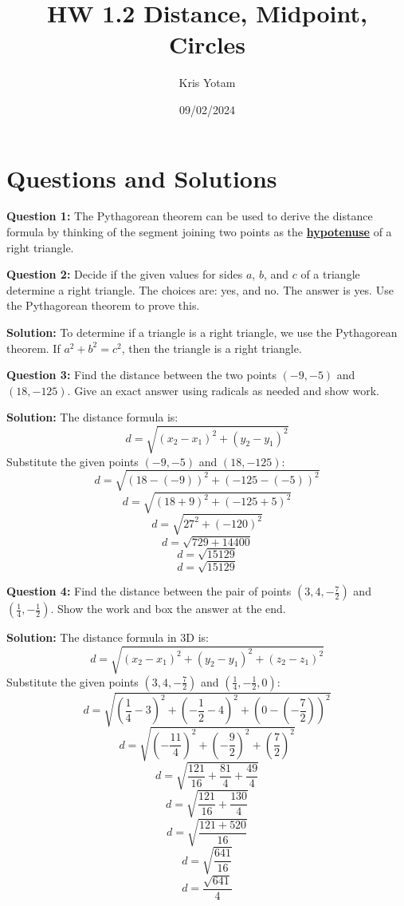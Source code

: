 \documentclass{article}
\title{HW 1.2 Distance, Midpoint, Circles}
\author{Kris Yotam}
\date{09/02/2024}
\begin{document}
\maketitle

\section{Questions and Solutions}

\textbf{Question 1:} The Pythagorean theorem can be used to derive the distance formula by thinking of the segment joining two points as the \underline{\textbf{hypotenuse}} of a right triangle.

\textbf{Question 2:} Decide if the given values for sides \(a\), \(b\), and \(c\) of a triangle determine a right triangle. The choices are: yes, and no. The answer is yes. Use the Pythagorean theorem to prove this.

\textbf{Solution:}
To determine if a triangle is a right triangle, we use the Pythagorean theorem. If \(a^2 + b^2 = c^2\), then the triangle is a right triangle.

\textbf{Question 3:} Find the distance between the two points \((-9, -5)\) and \((18, -125)\). Give an exact answer using radicals as needed and show work.

\textbf{Solution:}
The distance formula is:
\[
d = \sqrt{(x_2 - x_1)^2 + (y_2 - y_1)^2}
\]
Substitute the given points \((-9, -5)\) and \((18, -125)\):
\[
d = \sqrt{(18 - (-9))^2 + (-125 - (-5))^2}
\]
\[
d = \sqrt{(18 + 9)^2 + (-125 + 5)^2}
\]
\[
d = \sqrt{27^2 + (-120)^2}
\]
\[
d = \sqrt{729 + 14400}
\]
\[
d = \sqrt{15129}
\]
\[
d = \boxed{\sqrt{15129}}
\]

\textbf{Question 4:} Find the distance between the pair of points \((3, 4, -\frac{7}{2})\) and \((\frac{1}{4}, -\frac{1}{2})\). Show the work and box the answer at the end.

\textbf{Solution:}
The distance formula in 3D is:
\[
d = \sqrt{(x_2 - x_1)^2 + (y_2 - y_1)^2 + (z_2 - z_1)^2}
\]
Substitute the given points \((3, 4, -\frac{7}{2})\) and \((\frac{1}{4}, -\frac{1}{2}, 0)\):
\[
d = \sqrt{\left(\frac{1}{4} - 3\right)^2 + \left(-\frac{1}{2} - 4\right)^2 + \left(0 - \left(-\frac{7}{2}\right)\right)^2}
\]
\[
d = \sqrt{\left(-\frac{11}{4}\right)^2 + \left(-\frac{9}{2}\right)^2 + \left(\frac{7}{2}\right)^2}
\]
\[
d = \sqrt{\frac{121}{16} + \frac{81}{4} + \frac{49}{4}}
\]
\[
d = \sqrt{\frac{121}{16} + \frac{130}{4}}
\]
\[
d = \sqrt{\frac{121 + 520}{16}}
\]
\[
d = \sqrt{\frac{641}{16}}
\]
\[
d = \boxed{\frac{\sqrt{641}}{4}}
\]
\end{document}
